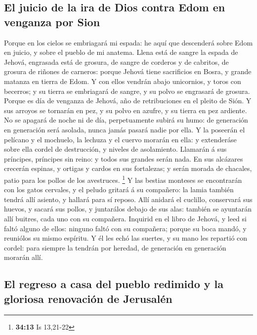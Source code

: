 \hypertarget{el-juicio-de-la-ira-de-dios-contra-edom-en-venganza-por-sion}{%
\subsection{El juicio de la ira de Dios contra Edom en venganza por
Sion}\label{el-juicio-de-la-ira-de-dios-contra-edom-en-venganza-por-sion}}

 Porque en los cielos se embriagará mi espada: he aquí que
descenderá sobre Edom en juicio, y sobre el pueblo de mi anatema.
 Llena está de sangre la espada de Jehová, engrasada está de
grosura, de sangre de corderos y de cabritos, de grosura de riñones de
carneros: porque Jehová tiene sacrificios en Bosra, y grande matanza en
tierra de Edom.  Y con ellos vendrán abajo unicornios, y
toros con becerros; y su tierra se embriagará de sangre, y su polvo se
engrasará de grosura.  Porque es día de venganza de Jehová,
año de retribuciones en el pleito de Sión.  Y sus arroyos se
tornarán en pez, y su polvo en azufre, y su tierra en pez ardiente.
 No se apagará de noche ni de día, perpetuamente subirá su
humo: de generación en generación será asolada, nunca jamás pasará nadie
por ella.  Y la poseerán el pelícano y el mochuelo, la
lechuza y el cuervo morarán en ella: y extenderáse sobre ella cordel de
destrucción, y niveles de asolamiento.  Llamarán á sus
príncipes, príncipes sin reino: y todos sus grandes serán nada.
 En sus alcázares crecerán espinas, y ortigas y cardos en
sus fortalezas; y serán morada de chacales, patio para los pollos de los
avestruces. \footnote{\textbf{34:13} Is 13,21-22}  Y las
bestias monteses se encontrarán con los gatos cervales, y el peludo
gritará á su compañero: la lamia también tendrá allí asiento, y hallará
para sí reposo.  Allí anidará el cuclillo, conservará sus
huevos, y sacará sus pollos, y juntarálos debajo de sus alas: también se
ayuntarán allí buitres, cada uno con su compañera. 
Inquirid en el libro de Jehová, y leed si faltó alguno de ellos: ninguno
faltó con su compañera; porque su boca mandó, y reuniólos su mismo
espíritu.  Y él les echó las suertes, y su mano les
repartió con cordel: para siempre la tendrán por heredad, de generación
en generación morarán allí.

\hypertarget{el-regreso-a-casa-del-pueblo-redimido-y-la-gloriosa-renovaciuxf3n-de-jerusaluxe9n}{%
\subsection{El regreso a casa del pueblo redimido y la gloriosa
renovación de
Jerusalén}\label{el-regreso-a-casa-del-pueblo-redimido-y-la-gloriosa-renovaciuxf3n-de-jerusaluxe9n}}

